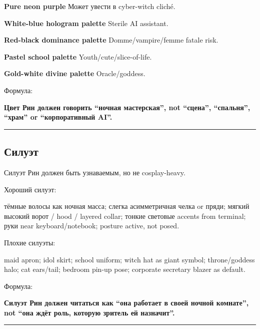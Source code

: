 \textbf{Pure neon purple} Может увести в cyber-witch cliché.

\textbf{White-blue hologram palette} Sterile AI assistant.

\textbf{Red-black dominance palette} Domme/\hspace{0pt}vampire/\hspace{0pt}femme fatale risk.

\textbf{Pastel school palette} Youth/\hspace{0pt}cute/\hspace{0pt}slice-of-life.

\textbf{Gold-white divine palette} Oracle/\hspace{0pt}goddess.

Формула:

\textbf{Цвет Рин должен говорить ``ночная мастерская'', not ``сцена'',
``спальня'', ``храм'' or ``корпоративный AI''.}

\begin{center}\rule{0.5\linewidth}{0.5pt}\end{center}

\subsection*{Силуэт}

Силуэт Рин должен быть узнаваемым, но не cosplay-heavy.

Хороший силуэт:

тёмные волосы как ночная масса; слегка асимметричная челка or пряди;
мягкий высокий ворот /\hspace{0pt} hood /\hspace{0pt} layered collar; тонкие световые accents
from terminal; руки near keyboard/\hspace{0pt}notebook; posture active, not posed.

Плохие силуэты:

maid apron; idol skirt; school uniform; witch hat as giant symbol;
throne/\hspace{0pt}goddess halo; cat ears/\hspace{0pt}tail; bedroom pin-up pose; corporate
secretary blazer as default.

Формула:

\textbf{Силуэт Рин должен читаться как ``она работает в своей ночной
комнате'', not ``она ждёт роль, которую зритель ей назначит''.}

\begin{center}\rule{0.5\linewidth}{0.5pt}\end{center}

